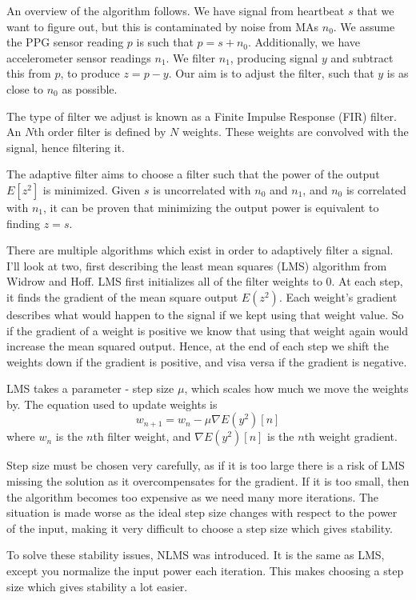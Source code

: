 \documentclass[12pt,a4paper,twoside,openright]{report}
\begin{document}
An overview of the algorithm follows. We have signal from heartbeat \(s\) that
we want to figure out, but this is contaminated by noise from MAs \(n_0\).
We assume the PPG sensor reading \(p\) is such that \(p=s+n_0\). Additionally,
we have accelerometer sensor readings \(n_1\). We filter \(n_1\), producing
signal \(y\) and subtract this from \(p\), to produce \(z=p-y\). Our aim is to
adjust the filter, such that \(y\) is as close to \(n_0\) as possible. 

The type of filter we adjust is known as a Finite Impulse Response (FIR)
filter. An \(N\)th order filter is defined by \(N\) weights.
These weights are convolved with the signal, hence filtering it.

The adaptive filter aims to choose a filter such that the power of the output 
\(E[z^2]\) is minimized. Given \(s\) is uncorrelated with \(n_0\) and \(n_1\), and \(n_0\)
is correlated with \(n_1\), it can be proven that minimizing the output power
is equivalent to finding \(z=s\).

There are multiple algorithms which exist in order to adaptively filter a
signal. I'll look at two, first describing the least mean squares (LMS) algorithm from
Widrow and Hoff. LMS first initializes all of the filter weights to 0. At each
step, it finds the gradient of the mean square output \(E(z^2)\).
Each weight's gradient describes what would happen to the signal if we kept
using that weight value. So if the gradient of a weight is positive we know
that using that weight again would increase the mean squared output. Hence, at
the end of each step we shift the weights down if the gradient is positive,
and visa versa if the gradient is negative.

LMS takes a parameter - step size \(\mu\), which scales how much we move the
weights by. The equation used to update weights is \[w_{n+1}=w_n-\mu \nabla
E(y^2)[n]\]
where \(w_n\) is the \(n\)th filter weight, and \(\nabla E(y^2)[n]\) is the
\(n\)th weight gradient.

Step size must be chosen very carefully, as if it is too large there is a risk
of LMS missing the solution as it overcompensates for the gradient. If it is
too small, then the algorithm becomes too expensive as we need many more
iterations. The situation is made worse as the ideal step size changes with
respect to the power of the input, making it very difficult to choose a step
size which gives stability.

To solve these stability issues, NLMS was introduced. It is the same as LMS, except you normalize the input power each
iteration. This makes choosing a step size which gives stability a lot easier.
\end{document}
